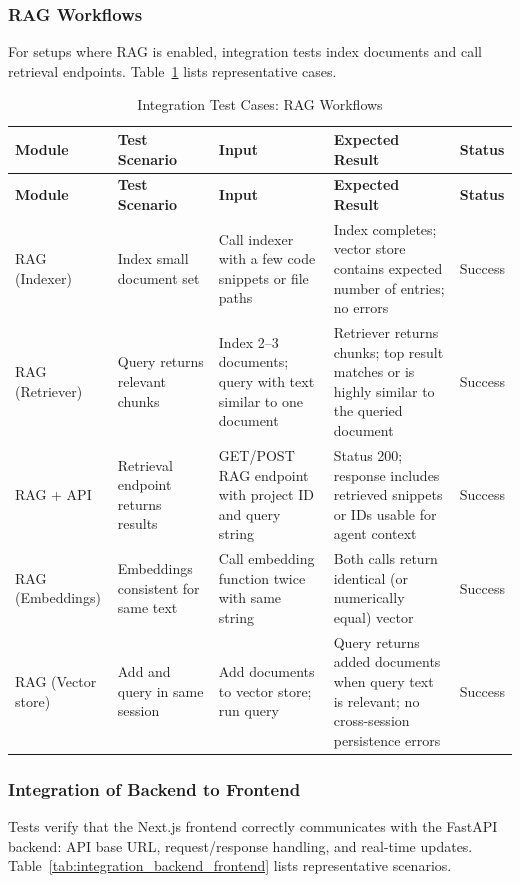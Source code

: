 \subsubsection*{RAG Workflows}
For setups where RAG is enabled, integration tests index documents and call retrieval endpoints. Table~\ref{tab:integration_rag} lists representative cases.

\renewcommand{\arraystretch}{1.2}
\begin{longtable}{|p{2.8cm}|p{3.4cm}|p{3.4cm}|p{4.2cm}|>{\centering\arraybackslash}p{1.6cm}|}
\caption{Integration Test Cases: RAG Workflows}
\label{tab:integration_rag}
\\
\hline
\textbf{Module} & \textbf{Test Scenario} & \textbf{Input} & \textbf{Expected Result} & \textbf{Status} \\
\hline
\endfirsthead
\hline
\textbf{Module} & \textbf{Test Scenario} & \textbf{Input} & \textbf{Expected Result} & \textbf{Status} \\
\hline
\endhead
\hline
\endfoot
\hline
\endlastfoot
RAG (Indexer) & Index small document set & Call indexer with a few code snippets or file paths & Index completes; vector store contains expected number of entries; no errors & Success \\
\hline
RAG (Retriever) & Query returns relevant chunks & Index 2--3 documents; query with text similar to one document & Retriever returns chunks; top result matches or is highly similar to the queried document & Success \\
\hline
RAG + API & Retrieval endpoint returns results & GET/POST RAG endpoint with project ID and query string & Status 200; response includes retrieved snippets or IDs usable for agent context & Success \\
\hline
RAG (Embeddings) & Embeddings consistent for same text & Call embedding function twice with same string & Both calls return identical (or numerically equal) vector & Success \\
\hline
RAG (Vector store) & Add and query in same session & Add documents to vector store; run query & Query returns added documents when query text is relevant; no cross-session persistence errors & Success \\
\hline
\end{longtable}

\subsubsection*{Integration of Backend to Frontend}
Tests verify that the Next.js frontend correctly communicates with the FastAPI backend: API base URL, request/response handling, and real-time updates. Table~\ref{tab:integration_backend_frontend} lists representative scenarios.

